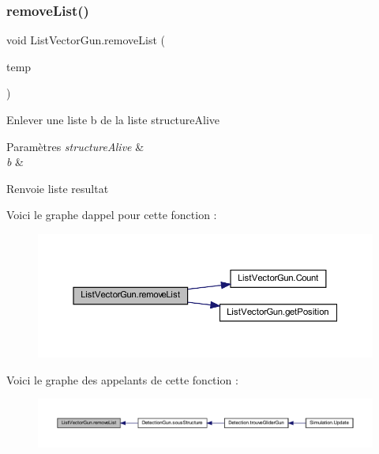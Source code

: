 \subsubsection{\texorpdfstring{remove\+List()}{removeList()}}
{\footnotesize\ttfamily void List\+Vector\+Gun.\+remove\+List (\begin{DoxyParamCaption}\item[{\mbox{\hyperlink{class_list_vector_gun}{List\+Vector\+Gun}}}]{temp }\end{DoxyParamCaption})\hspace{0.3cm}{\ttfamily [inline]}}



Enlever une liste b de la liste structure\+Alive 


\begin{DoxyParams}{Paramètres}
{\em structure\+Alive} & \\
\hline
{\em b} & \\
\hline
\end{DoxyParams}
\begin{DoxyReturn}{Renvoie}
liste resultat
\end{DoxyReturn}
Voici le graphe d\textquotesingle{}appel pour cette fonction \+:
\nopagebreak
\begin{figure}[H]
\begin{center}
\leavevmode
\includegraphics[width=350pt]{class_list_vector_gun_a81d2c8a06d61648f274eb644901f1959_cgraph}
\end{center}
\end{figure}
Voici le graphe des appelants de cette fonction \+:
\nopagebreak
\begin{figure}[H]
\begin{center}
\leavevmode
\includegraphics[width=350pt]{class_list_vector_gun_a81d2c8a06d61648f274eb644901f1959_icgraph}
\end{center}
\end{figure}
\mbox{\label{class_list_vector_gun_a92aa301df19a9b1cd5f6e635e6a0c86f}} 
